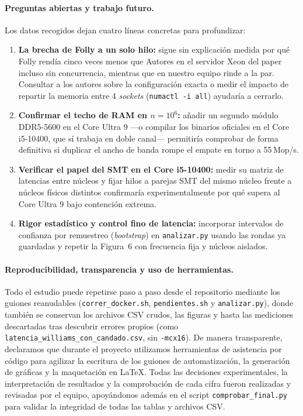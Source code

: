 \documentclass[11pt,a4paper]{article}
\begin{document}
\paragraph{Preguntas abiertas y trabajo futuro.}
Los datos recogidos dejan cuatro líneas concretas para profundizar:
\begin{enumerate}
  \item \textbf{La brecha de Folly a un solo hilo:} sigue sin explicación medida por qué Folly rendía cinco veces menos que Autores en el servidor Xeon del paper incluso sin concurrencia, mientras que en nuestro equipo rinde a la par. Consultar a los autores sobre la configuración exacta o medir el impacto de repartir la memoria entre 4 \emph{sockets} (\texttt{numactl -i all}) ayudaría a cerrarlo.
  \item \textbf{Confirmar el techo de RAM en $n = 10^6$:} añadir un segundo módulo DDR5-5600 en el Core Ultra 9 —o compilar los binarios oficiales en el Core i5-10400, que sí trabaja en doble canal— permitiría comprobar de forma definitiva si duplicar el ancho de banda rompe el empate en torno a 55\,Mop/s.
  \item \textbf{Verificar el papel del SMT en el Core i5-10400:} medir su matriz de latencias entre núcleos y fijar hilos a parejas SMT del mismo núcleo frente a núcleos físicos distintos confirmaría experimentalmente por qué supera al Core Ultra 9 bajo contención extrema.
  \item \textbf{Rigor estadístico y control fino de latencia:} incorporar intervalos de confianza por remuestreo (\emph{bootstrap}) en \texttt{analizar.py} usando las rondas ya guardadas y repetir la Figura~6 con frecuencia fija y núcleos aislados.
\end{enumerate}

\paragraph{Reproducibilidad, transparencia y uso de herramientas.}
Todo el estudio puede repetirse paso a paso desde el repositorio mediante los guiones reanudables (\texttt{correr\_\allowbreak docker.sh}, \texttt{pendientes.sh} y \texttt{analizar.py}), donde también se conservan los archivos CSV crudos, las figuras y hasta las mediciones descartadas tras descubrir errores propios (como \texttt{latencia\_\allowbreak williams\_\allowbreak con\_\allowbreak candado.csv}, sin \texttt{-mcx16}). De manera transparente, declaramos que durante el proyecto utilizamos herramientas de asistencia por código para agilizar la escritura de los guiones de automatización, la generación de gráficas y la maquetación en \LaTeX. Todas las decisiones experimentales, la interpretación de resultados y la comprobación de cada cifra fueron realizadas y revisadas por el equipo, apoyándonos además en el script \texttt{comprobar\_\allowbreak final.py} para validar la integridad de todas las tablas y archivos CSV.



\end{document}
